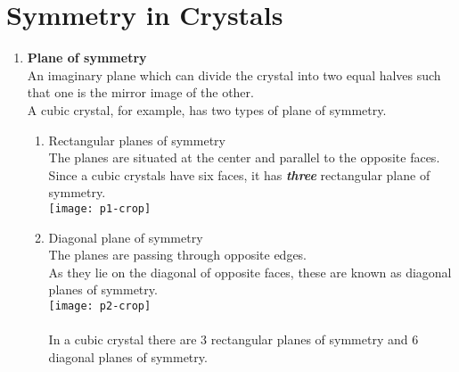 \section{Symmetry in Crystals}
\begin{enumerate}
	\item \textbf{Plane of symmetry}\\
	An imaginary plane which can divide the crystal into two equal halves such that one is the mirror image of the other.\\
	A cubic crystal, for example, has two types of plane of symmetry.
	\begin{enumerate}[label=\alph*., itemsep=\baselineskip]
		\item Rectangular planes of symmetry\\
		The planes are situated at the center and parallel to the opposite faces.\\
		Since a cubic crystals have six faces, it has \textbf{\textit{three}} rectangular plane of symmetry.\\
		\texttt{[image: p1-crop]}
		\item Diagonal plane of symmetry\\
		The planes are passing through opposite edges.\\
		As they lie on the diagonal of opposite faces, these are known as diagonal planes of symmetry.\\
		\texttt{[image: p2-crop]}	\\\\
		In a cubic crystal there are 3 rectangular planes of symmetry and 6 diagonal planes of symmetry. 		
	\end{enumerate}
	

\end{enumerate}
